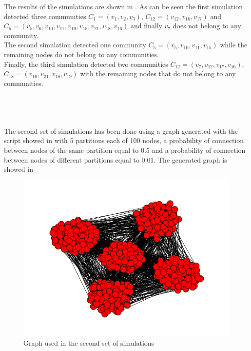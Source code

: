 \documentclass[12pt]{article}
\begin{document}
The results of the simulations are shown in . As can be seen the first simulation detected three communities $C_1 = ({v_1, v_2, v_3})$, $C_{12} =({v_{12}, v_{16}, v_{17}})$ and $C_5 ={(v_5, v_6, v_{10}, v_{11}, v_{19}, v_{15}, v_{21}, v_{18}, v_{16})}$ and finally $v_7$ does not belong to any community. \\
The second simulation detected one community $C_5 = ({v_5, v_{10}, v_{11}, v_{15}})$ while the remaining nodes do not belong to any communities.\\
Finally, the third simulation detected two communities $C_{12}=({v_7, v_{12}, v_{17}, v_{16}})$, $C_{18} =({v_{16}, v_{21}, v_{18}, v_{19}})$ with the remaining nodes that do not belong to any communities.
\\
\\
\\
\\
\\
The second set of simulations has been done using a graph generated with the script showed in  with 5 partitions each of 100 nodes, a probability of connection between nodes of the same partition equal to 0.5 and a probability of connection between nodes of different partitions equal to 0.01. The generated graph is showed in 
     \begin{figure}[H]
       \centering
         \includegraphics[width=1\textwidth]{Graph500.png}
       \caption{Graph used in the second set of simulations}
       \label{fig:Graph500}
     \end{figure}
\end{document}
